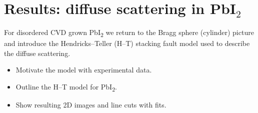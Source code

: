 \section{Results: diffuse scattering in PbI\texorpdfstring{$_2$}{2}}

For disordered CVD grown PbI\textsubscript{2} we return to the Bragg
sphere (cylinder) picture and introduce the Hendricks--Teller (H--T)
stacking fault model used to describe the diffuse scattering.

\begin{itemize}
  \item Motivate the model with experimental data.
  \item Outline the H--T model for PbI\textsubscript{2}.
  \item Show resulting 2D images and line cuts with fits.
\end{itemize}

